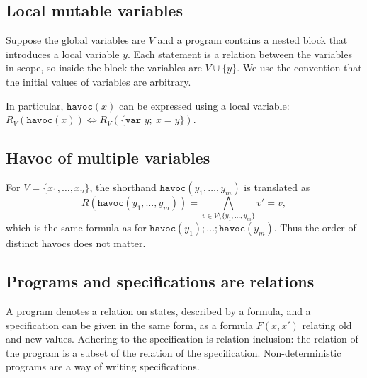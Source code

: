 \subsection*{Local mutable variables}
 
Suppose the global variables are $V$ and a program contains a nested block that introduces a local variable $y$. Each statement is a relation between the variables in scope, so inside the block the variables are $V \cup \{y\}$. We use the convention that the initial values of variables are arbitrary.
 
 
In particular, $\texttt{havoc}(x)$ can be expressed using a local variable: $R_V(\texttt{havoc}(x)) \iff R_V(\{\texttt{var } y;\ x = y\})$.
 
\subsection*{Havoc of multiple variables}
 
For $V = \{x_1, \ldots, x_n\}$, the shorthand $\texttt{havoc}(y_1, \ldots, y_m)$ is translated as
\[
R(\texttt{havoc}(y_1, \ldots, y_m)) = \bigwedge_{v \in V \setminus \{y_1, \ldots, y_m\}} v' = v,
\]
which is the same formula as for $\texttt{havoc}(y_1); \ldots; \texttt{havoc}(y_m)$. Thus the order of distinct havocs does not matter.
 
\subsection*{Programs and specifications are relations}
 
A program denotes a relation on states, described by a formula, and a specification can be given in the same form, as a formula $F(\bar x, \bar x')$ relating old and new values. Adhering to the specification is relation inclusion: the relation of the program is a subset of the relation of the specification. Non-deterministic programs are a way of writing specifications.
 
